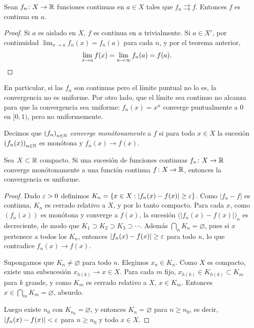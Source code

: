 \begin{theorem}
  Sean \(f_n\colon X \to \mathbb{R}\) funciones continuas en \(a \in X\) tales que \(f_n \rightrightarrows f\). Entonces \(f\) es continua en \(a\).
\end{theorem}

\begin{proof}
  Si \(a\) es aislado en \(X\), \(f\) es continua en \(a\) trivialmente. Si \(a \in X'\), por continuidad \(\lim_{x \to a} f_n(x) = f_n(a)\) para cada \(n\), y por el teorema anterior,
  \[
    \lim_{x \to a} f(x) = \lim_{n \to \infty} f_n(a) = f(a). \qedhere
  \]
\end{proof}

En particular, si las \(f_n\) son continuas pero el límite puntual no lo es, la convergencia no es uniforme. Por otro lado, que el límite sea continuo no alcanza para que la convergencia sea uniforme: \(f_n(x) = x^n\) converge puntualmente a \(0\) en \([0, 1)\), pero no uniformemente.

\begin{definition}
  Decimos que \({(f_n)}_{n \in \mathbb{N}}\) \emph{converge monótonamente} a \(f\) si para todo \(x \in X\) la sucesión \({(f_n(x))}_{n \in \mathbb{N}}\) es monótona y \(f_n(x) \to f(x)\).
\end{definition}

\begin{theorem}[Dini]
  Sea \(X \subset \mathbb{R}\) compacto. Si una sucesión de funciones continuas \(f_n\colon X \to \mathbb{R}\) converge monótonamente a una función continua \(f\colon X \to \mathbb{R}\), entonces la convergencia es uniforme.
\end{theorem}

\begin{proof}
  Dado \(\varepsilon > 0\) definimos \(K_n = \{ x \in X : |f_n(x) - f(x)| \geq \varepsilon \}\). Como \(|f_n - f|\) es continua, \(K_n\) es cerrado relativo a \(X\), y por lo tanto compacto. Para cada \(x\), como \({(f_n(x))}\) es monótona y converge a \(f(x)\), la sucesión \({\bigl( |f_n(x) - f(x)| \bigr)}_n\) es decreciente, de modo que \(K_1 \supset K_2 \supset K_3 \supset \cdots\). Además \(\bigcap_{n} K_n = \varnothing\), pues si \(x\) pertenece a todos los \(K_n\), entonces \(|f_n(x) - f(x)| \geq \varepsilon\) para todo \(n\), lo que contradice \(f_n(x) \to f(x)\).

  Supongamos que \(K_n \neq \varnothing\) para todo \(n\). Elegimos \(x_n \in K_n\). Como \(X\) es compacto, existe una subsucesión \(x_{h(k)} \to x \in X\). Para cada \(m\) fijo, \(x_{h(k)} \in K_{h(k)} \subset K_m\) para \(k\) grande, y como \(K_m\) es cerrado relativo a \(X\), \(x \in K_m\). Entonces \(x \in \bigcap_m K_m = \varnothing\), absurdo.

  Luego existe \(n_0\) con \(K_{n_0} = \varnothing\), y entonces \(K_n = \varnothing\) para \(n \geq n_0\), es decir, \(|f_n(x) - f(x)| < \varepsilon\) para \(n \geq n_0\) y todo \(x \in X\).
\end{proof}

